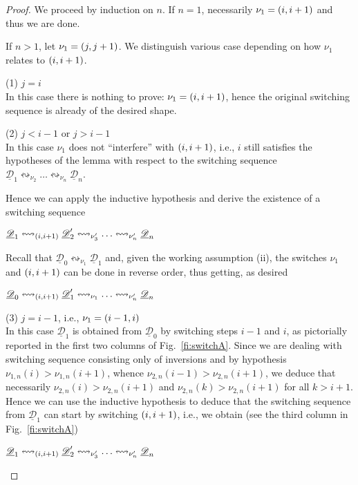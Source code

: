 \documentclass[a4paper,UKenglish,cleveref,pdftex, thm-restate,numberwithinsect,anonymous]{lipics}
\newcommand{\dder}[1]{\mathscr{#1}}
\newcommand{\der}[1]{\underline{\dder{#1}}}
\newcommand{\shift}[1]{\ensuremath{\mathrel{{\leftrightsquigarrow}_{#1}}}}
\begin{document}
\begin{proof}
  We proceed by induction on $n$. If $n=1$, necessarily
  $\nu_1 =  \transp{i}$ and thus we are done.

  If $n>1$, let $\nu_1 = \transp{j}$.  We distinguish various case
  depending on how $\nu_1$ relates to $\transp{i}$.

  \bigskip
  \noindent
  (1) $j=i$\\
  In this case there is nothing to prove: $\nu_1 = \transp{i}$, hence
  the original switching sequence is already of the desired shape.

  \bigskip
  \noindent
  (2) $j<i-1$ or $j>i-1$\\
  In this case $\nu_1$ does not ``interfere'' with $\transp{i}$, i.e.,
  $i$ still satisfies the hypotheses of the lemma with respect to the
  switching sequence
  $\der{D}_1 \shift{\nu_2} \ldots \shift{\nu_n} \der{D}_n$.

  Hence we can apply the inductive hypothesis and derive the existence
  of a switching sequence
  \begin{center}
    $\der{D}_1 \shift{\transp{i}} \der{D}_2' \shift{\nu_3'} \ldots \shift{\nu_n'} \der{D}_n$
  \end{center}

  Recall that $\der{D}_0 \shift{\nu_1} \der{D}_1$ and, given the
  working assumption (ii), the switches $\nu_1$ and $\transp{i}$ can
  be done in reverse order, thus getting, as desired
  \begin{center}
    $\der{D}_0 \shift{\transp{i}} \der{D}_1' \shift{\nu_1} \ldots
    \shift{\nu_n'} \der{D}_n$
  \end{center}


  \bigskip
  \noindent
  (3) $j=i-1$, i.e., $\nu_1 = \transp{i-1}[i]$\\
  In this case $\der{D}_1$ is obtained from $\der{D}_0$ by switching
  steps $i-1$ and $i$, as pictorially reported in the first two
  columns of Fig.~\ref{fi:switchA}. Since we are dealing with
  switching sequence consisting only of inversions and by hypothesis
  $\nu_{1,n}(i) > \nu_{1,n}(i+1)$, whence
  $\nu_{2,n}(i-1) > \nu_{2,n}(i+1)$, we deduce that necessarily
  $\nu_{2,n}(i) > \nu_{2,n}(i+1)$ and $\nu_{2,n}(k) > \nu_{2,n}(i+1)$
  for all $k > i+1$. Hence we can use the inductive hypothesis to
  deduce that the switching sequence from $\der{D}_1$ can start by
  switching $\transp{i}$, i.e., we obtain (see the third column in
  Fig.~\ref{fi:switchA})
  \begin{center}
    $\der{D}_1 \shift{\transp{i}} \der{D}_2' \shift{\nu_3'} \ldots
    \shift{\nu_n'} \der{D}_n$
  \end{center}


\end{proof}
\end{document}
